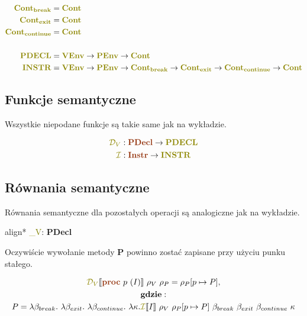 \documentclass{article}
\newcommand{\sembr}[1]{[\![#1]\!]}
\newcommand{\syn}[1]{{\bf \textcolor{RawSienna}{#1}}}
\newcommand{\sem}[1]{{\bf \textcolor{olive}{#1}}}
\newcommand{\semcol}[1]{{\textcolor{olive}{#1}}}
\newcommand{\sembr}[1]{[\![#1]\!]}
\newcommand{\boxedeq}[1]{\begin{empheq}[box={\fboxsep=6pt\fbox}]{align*}#1\end{empheq}}
\newcommand{\boxedeq}[1]{\begin{empheq}[box={\fboxsep=6pt\fbox}]{align*}#1\end{empheq}}
\begin{document}
   \begin{gather*}
      \begin{aligned}
         \sem{Cont}_{\sem{break}} &= \sem{Cont} \\
         \sem{Cont}_{\sem{exit}} &= \sem{Cont} \\
         \sem{Cont}_{\sem{continue}} &= \sem{Cont} \\
         \\
         \sem{PDECL} &=
         \sem{VEnv} \to
         \sem{PEnv} \to
         \sem{Cont} \\
         \sem{INSTR} &=
         \sem{VEnv} \to
         \sem{PEnv} \to
         \sem{Cont}_{\sem{break}} \to
         \sem{Cont}_{\sem{exit}} \to
         \sem{Cont}_{\sem{continue}} \to
         \sem{Cont} \\
      \end{aligned}
   \end{gather*}


   \subsection{Funkcje semantyczne}

   Wszystkie niepodane funkcje są takie same jak na wykładzie.

   \begin{gather*}
      \semcol{\mathcal{D}_{V}}: \syn{PDecl} \to \sem{PDECL} \\
      \semcol{\mathcal{I}}: \syn{Instr} \to \sem{INSTR} \\
   \end{gather*}


   \subsection{Równania semantyczne}

   Równania semantyczne dla pozostałych operacji są analogiczne jak na wykładzie.

   \boxedeq{ \semcol{_{V}}: \syn{PDecl} \to \sem{PDECL} }

   Oczywiście wywołanie metody {\bf P} powinno zostać zapisane przy użyciu punku stałego.

   \begin{gather*}
      \semcol{\mathcal{D}_{V}}\sembr{\syn{proc} \ p \ (I)}
      \ \rho_{V} \ \rho_{P} =
      \rho_{P}[p \mapsto P], \\
      {\bf gdzie:} \\
      P =
      \lambda \beta_{break}. \
      \lambda \beta_{exit}. \
      \lambda \beta_{continue}. \
      \lambda \kappa.
      \semcol{\mathcal{I}}\sembr{I}
      \ \rho_{V} \ \rho_{P}[p \mapsto P] \ \beta_{break} \ \beta_{exit} \ \beta_{continue} \ \kappa
   \end{gather*}
\end{document}
